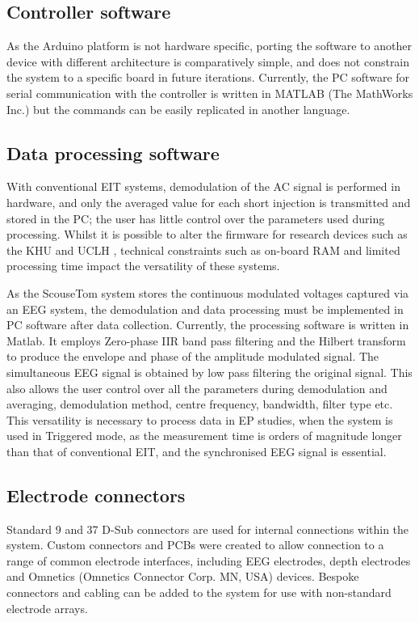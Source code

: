 
\subsection{Controller software}

As the Arduino platform is not hardware specific, porting the software to another device with different architecture is comparatively simple, and does not constrain the system to a specific board in future iterations. Currently, the PC software for serial communication with the controller is written in MATLAB (The MathWorks Inc.) but the commands can be easily replicated in another language.

\subsection{Data processing software}

With conventional EIT systems, demodulation of the AC signal is performed in hardware, and only the averaged value for each short injection is transmitted and stored in the PC; the user has little control over the parameters used during processing. Whilst it is possible to alter the firmware for research devices such as the KHU \cite{Hun_Wi_2014} and UCLH \cite{McEwan_2006}, technical constraints such as on-board RAM and limited processing time impact the versatility of these systems. 

As the ScouseTom system stores the continuous modulated voltages captured via an EEG system, the demodulation and data processing must be implemented in PC software after data collection. Currently, the processing software is written in Matlab. It employs Zero-phase IIR band pass filtering and the Hilbert transform to produce the envelope and phase of the amplitude modulated signal. The simultaneous EEG signal is obtained by low pass filtering the original signal. This also allows the user control over all the parameters during demodulation and averaging, demodulation method, centre frequency, bandwidth, filter type etc. This versatility is necessary to process data in EP studies, when the system is used in Triggered mode, as the measurement time is orders of magnitude longer than that of conventional EIT, and the synchronised EEG signal is essential. 

\subsection{Electrode connectors}

Standard 9 and 37 D-Sub connectors are used for internal connections within the system. Custom connectors and PCBs were created to allow connection to a range of common electrode interfaces, including EEG electrodes, depth electrodes and Omnetics (Omnetics Connector Corp. MN, USA) devices. Bespoke connectors and cabling can be added to the system for use with non-standard electrode arrays.